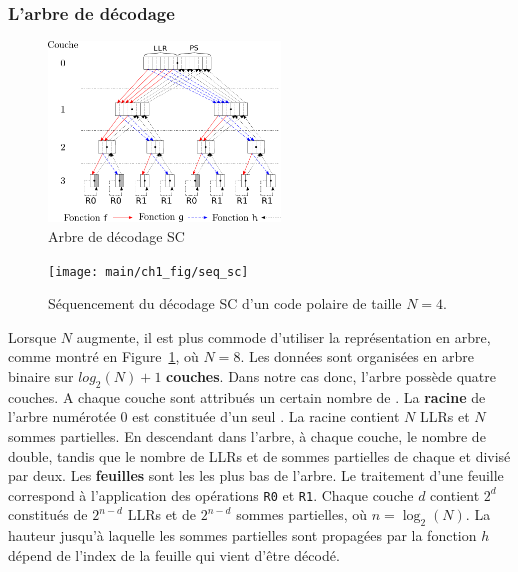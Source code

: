 \subsubsection{L'arbre de décodage}
\begin{figure}[t]
\centering
\includegraphics[width=0.55\textwidth]{main/ch1_fig/sc}
\caption{Arbre de décodage SC}
\label{fig:sc}
\end{figure}
\begin{figure}[t]
\centering
\texttt{[image: main/ch1\_fig/seq\_sc]}
\caption{Séquencement du décodage SC d'un code polaire de taille $N=4$.}
\label{fig:seq_sc}
\end{figure}
Lorsque $N$ augmente, il est plus commode d'utiliser la représentation en arbre, comme montré en Figure~\ref{fig:sc}, où $N=8$.
Les données sont organisées en arbre binaire sur $log_2(N) + 1$ \textbf{couches}. Dans notre cas donc, l'arbre possède quatre couches.
A chaque couche sont attribués un certain nombre de \textbf{\noeuds}.
La \textbf{racine} de l'arbre numérotée $0$ est constituée d'un seul \noeud.
La racine contient $N$ LLRs et $N$ sommes partielles.
En descendant dans l'arbre, à chaque couche, le nombre de \noeuds double, tandis que le nombre de LLRs et de sommes partielles de chaque \noeud et divisé par deux.
Les \textbf{feuilles} sont les \noeuds les plus bas de l'arbre.
Le traitement d'une feuille correspond à l'application des opérations \texttt{R0} et \texttt{R1}.
Chaque couche $d$ contient $2^d$ \noeuds constitués de $2^{n-d}$ LLRs et de $2^{n-d}$ sommes partielles, où $n=\log_2(N)$. 
La hauteur jusqu'à laquelle les sommes partielles sont propagées par la fonction $h$ dépend de l'index de la feuille qui vient d'être décodé.

